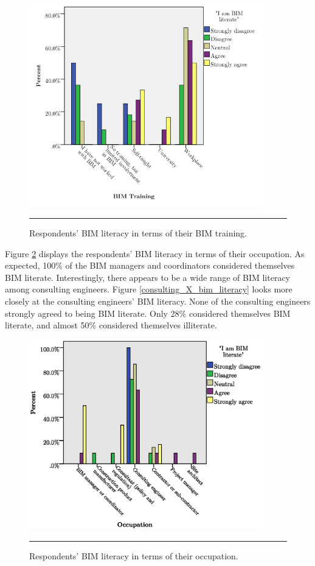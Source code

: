 \begin{figure}[htbp]
	\centering
	\includegraphics[width=0.9\textwidth]{figures/BIM_trainingXliteracy.png}
	\rule{0.9\textwidth}{0.5pt} %
	\caption{Respondents' BIM literacy in terms of their BIM training.}
	\label{bim_training_X_bim_literacy}
\end{figure}

Figure \ref{position_X_bim_literacy} displays the respondents' BIM literacy in terms of their occupation.
As expected, 100\% of the BIM managers and coordinators considered themselves BIM literate.
Interestingly, there appears to be a wide range of BIM literacy among consulting engineers.
Figure \ref{consulting_X_bim_literacy} looks more closely at the consulting engineers' BIM literacy.
None of the consulting engineers strongly agreed to being BIM literate.
Only 28\% considered themselves BIM literate, and almost 50\% considered themselves illiterate.


\begin{figure}[htbp]
	\centering
	\includegraphics[width=0.9\textwidth]{figures/BIMLiteracyXPositions.eps}
	\rule{0.9\textwidth}{0.5pt} %
	\caption{Respondents' BIM literacy in terms of their occupation.}
	\label{position_X_bim_literacy}
\end{figure}



